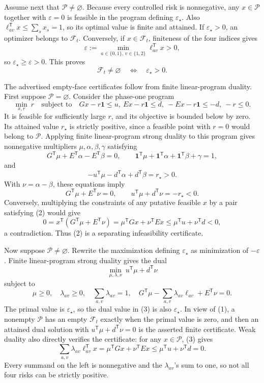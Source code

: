 Assume next that \(\mathcal P\neq\varnothing\).  Because every controlled risk is nonnegative, any \(x\in\mathcal P\) together with \(\varepsilon=0\) is feasible in the program defining \(\varepsilon_\star\).  Also \(\ell_{av}^{\mathsf T}x\leq\sum_sx_s=1\), so its optimal value is finite and attained.  If \(\varepsilon_\star>0\), an optimizer belongs to \(\mathcal F_t\).  Conversely, if \(x\in\mathcal F_t\), finiteness of the four indices gives
\[
 \varepsilon:=\min_{a\in\{0,1\},\,v\in\{1,2\}}
       \ell_{av}^{\mathsf T}x>0,
\]
so \(\varepsilon_\star\geq\varepsilon>0\).  This proves
\[
 \mathcal F_t\neq\varnothing\quad\Longleftrightarrow\quad
 \varepsilon_\star>0.                                      \tag{1}
\]

The advertised empty-face certificates follow from finite linear-program duality.  First suppose \(\mathcal P=\varnothing\).  Consider the phase-one program
\[
 \min_{x,r}\ r
 \quad\text{subject to}\quad
 Gx-r\mathbf 1\leq u,
 \ Ex-r\mathbf 1\leq d,
 \ -Ex-r\mathbf 1\leq-d,
 \ -r\leq0.
\]
It is feasible for sufficiently large \(r\), and its objective is bounded below by zero.  Its attained value \(r_\star\) is strictly positive, since a feasible point with \(r=0\) would belong to \(\mathcal P\).  Applying finite linear-program strong duality to this program gives nonnegative multipliers \(\mu,\alpha,\beta,\gamma\) satisfying
\[
 G^{\mathsf T}\mu+E^{\mathsf T}\alpha-E^{\mathsf T}\beta=0,
 \qquad
 \mathbf 1^{\mathsf T}\mu+\mathbf 1^{\mathsf T}\alpha
 +\mathbf 1^{\mathsf T}\beta+\gamma=1,
\]
and
\[
 -u^{\mathsf T}\mu-d^{\mathsf T}\alpha+d^{\mathsf T}\beta=r_\star>0.
\]
With \(\nu=\alpha-\beta\), these equations imply
\[
 G^{\mathsf T}\mu+E^{\mathsf T}\nu=0,
 \qquad u^{\mathsf T}\mu+d^{\mathsf T}\nu=-r_\star<0.       \tag{2}
\]
Conversely, multiplying the constraints of any putative feasible \(x\) by a pair satisfying (2) would give
\[
 0=x^{\mathsf T}(G^{\mathsf T}\mu+E^{\mathsf T}\nu)
   =\mu^{\mathsf T}Gx+\nu^{\mathsf T}Ex
   \leq\mu^{\mathsf T}u+\nu^{\mathsf T}d<0,
\]
a contradiction.  Thus (2) is a separating infeasibility certificate.

Now suppose \(\mathcal P\neq\varnothing\).  Rewrite the maximization defining \(\varepsilon_\star\) as minimization of \(-\varepsilon\).  Finite linear-program strong duality gives the dual
\[
 \min_{\mu,\lambda,\nu}\ u^{\mathsf T}\mu+d^{\mathsf T}\nu
\]
subject to
\[
 \mu\geq0,\quad\lambda_{av}\geq0,\quad
 \sum_{a,v}\lambda_{av}=1,\quad
 G^{\mathsf T}\mu-\sum_{a,v}\lambda_{av}\ell_{av}
       +E^{\mathsf T}\nu=0.                                \tag{3}
\]
The primal value is \(\varepsilon_\star\), so the dual value in (3) is also \(\varepsilon_\star\).  In view of (1), a nonempty \(\mathcal P\) has an empty \(\mathcal F_t\) exactly when the primal value is zero, and then an attained dual solution with
\(u^{\mathsf T}\mu+d^{\mathsf T}\nu=0\) is the asserted finite certificate.  Weak duality also directly verifies the certificate: for any \(x\in\mathcal P\), (3) gives
\[
 \sum_{a,v}\lambda_{av}\ell_{av}^{\mathsf T}x
 =\mu^{\mathsf T}Gx+\nu^{\mathsf T}Ex
 \leq\mu^{\mathsf T}u+\nu^{\mathsf T}d=0.
\]
Every summand on the left is nonnegative and the \(\lambda_{av}\)'s sum to one, so not all four risks can be strictly positive.

